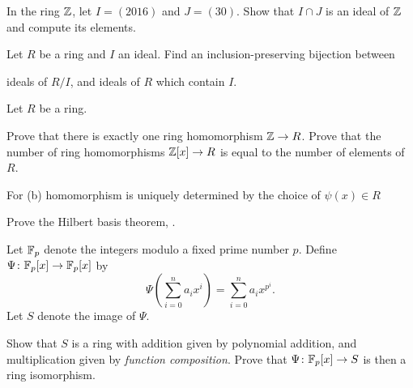 \begin{problem}
	In the ring $\mathbb Z$, let $I = (2016)$ and $J = (30)$.
	Show that $I \cap J$ is an ideal of $\mathbb Z$ and compute its elements.
\end{problem}

\begin{sproblem}
	\label{prob:inclusion_preserving}
	Let $R$ be a ring and $I$ an ideal.
	Find an inclusion-preserving bijection between
	\begin{itemize}
		\ii ideals of $R/I$, and
		\ii ideals of $R$ which contain $I$.
	\end{itemize}
\end{sproblem}

\begin{problem}
	Let $R$ be a ring.
	\begin{enumerate}[(a)]
		\ii Prove that there is exactly one ring homomorphism $\mathbb Z \to R$.
		\ii Prove that the number of ring homomorphisms
		$\mathbb Z[x] \to R$ is equal to the number of elements of $R$.
	\end{enumerate}
	\begin{hint}
		For (b) homomorphism is uniquely determined by the choice of $\psi(x) \in R$
	\end{hint}
\end{problem}


\begin{problem}
	\onechili
	Prove the Hilbert basis theorem, \Cref{thm:hilbert_basis}.
\end{problem}

\begin{problem}
	Let $\mathbb F_p$ denote the integers modulo a fixed prime number $p$.
	Define $\Psi \colon \mathbb F_p[x] \to \mathbb F_p[x]$ by
	\[ \Psi\left( \sum_{i=0}^n a_i x^i \right) = \sum_{i=0}^n a_i x^{p^i}. \]
	Let $S$ denote the image of $\Psi$.
	\begin{enumerate}[(a)]
		\ii Show that $S$ is a ring with addition
		given by polynomial addition,
		and multiplication given by \emph{function composition}.
		\ii Prove that $\Psi \colon \mathbb F_p[x] \to S$
		is then a ring isomorphism.
	\end{enumerate}
\end{problem}

